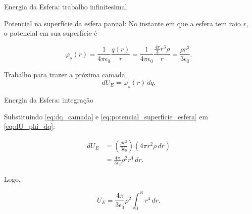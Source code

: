 \documentclass[aspectratio=169,11pt]{beamer}
\begin{document}
\begin{frame}{Energia da Esfera: trabalho infinitesimal}

\begin{mybox}{Potencial na superfície da esfera parcial: }
No instante em que a esfera tem raio $r$, o potencial em sua superfície é
\end{mybox}

\begin{eqbox}
\begin{equation}
\varphi_s(r)
=
\frac{1}{4\pi\epsilon_0}\frac{q(r)}{r}
=
\frac{1}{4\pi\epsilon_0}
\frac{\frac{4\pi}{3}r^3\rho}{r}
=
\frac{\rho r^2}{3\epsilon_0}.
\label{eq:potencial_superficie_esfera}
\end{equation}
\end{eqbox}

\begin{mybox}{Trabalho para trazer a próxima camada}
\begin{equation}
dU_E = \varphi_s(r)\,dq .
\label{eq:dU_phi_dq}
\end{equation}
\end{mybox}

\end{frame}

\begin{frame}{Energia da Esfera: integração}

Substituindo \eqref{eq:dq_camada} e \eqref{eq:potencial_superficie_esfera} em \eqref{eq:dU_phi_dq}:

\begin{eqbox}
\begin{align}
dU_E
&=
\left(\frac{\rho r^2}{3\epsilon_0}\right)
\left(4\pi r^2\rho\,dr\right)
\nonumber\\
&=
\frac{4\pi}{3\epsilon_0}\rho^2 r^4\,dr .
\label{eq:dU_esfera}
\end{align}
\end{eqbox}

Logo,

\begin{eqbox}
\begin{equation}
U_E
=
\frac{4\pi}{3\epsilon_0}
\rho^2
\int_0^R r^4\,dr .
\label{eq:UE_integral_esfera}
\end{equation}
\end{eqbox}

\end{frame}
\end{document}
